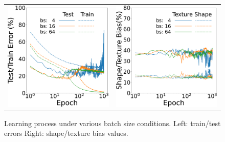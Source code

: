 \begin{figure}[htb]
\centering
   \begin{tabular}{cc}
      \hspace{-5mm}
      \includegraphics[keepaspectratio, width=0.45\linewidth]{fig/batchsize_learning_curv.pdf} &
        \hspace{5pt} 
      \includegraphics[keepaspectratio, width=0.45\linewidth]{fig/batchsize_sha_tex.pdf}
   \end{tabular}
\caption[Learning process under various batch size conditions.]{Learning process under various batch size conditions. Left: train/test errors Right: shape/texture bias values.}
\label{fig:comp_batchsize}
\end{figure}

\begin{table}[htb]
    \centering
    \caption{
    Correlation coefficients and scores in Phase 1, 2 and Phase 3 for different CNN models.
    }
    \label{tab:corr_batchsize}
\end{table}

